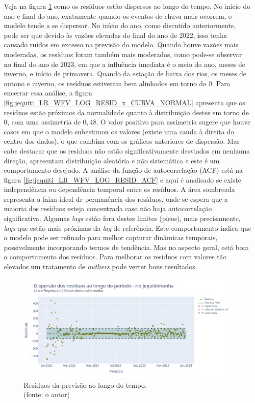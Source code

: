 Veja na figura \ref{fig:jequiti_LR_WFV_LOG_RESID_x_TEMPO} como os resíduos estão dispersos ao longo do tempo. No início do ano e final do ano, exatamente quando os eventos de chuva mais ocorrem, o modelo tende a se dispersar. No início do ano, como discutido anteriormente, pode ser que devido às vazões elevadas do final do ano de 2022, isso tenha causado ruídos em excesso na previsão do modelo. Quando houve vazões mais moderadas, os resíduos foram também mais moderados, como pode-se observar no final do ano de 2023, em que a influência imediata é o meio do ano, meses de inverno, e início de primavera. Quando da estação de baixa dos rios, os meses de outono e inverno, os resíduos estiveram bem alinhados em torno do $0$. Para encerrar essa análise, a figura \ref{fig:jequiti_LR_WFV_LOG_RESID_x_CURVA_NORMAL} apresenta que os resíduos estão próximos da normalidade quanto à distribuição destes em torno de $0$, com uma assimetria de $0,48$. O valor positivo para assimetria sugere que houve casos em que o modelo subestimou os valores (existe uma cauda à direita do centro dos dados), o que combina com os gráficos anteriores de dispersão. Mas cabe destacar que os resíduos não estão significativamente desviados em nenhuma direção, apresentam distribuição aleatória e não sistemática e este é um comportamento desejado. A análise da função de autocorrelação (ACF) está na figura \ref{fig:jequiti_LR_WFV_LOG_RESID_ACF} e aqui é analisado se existe independência ou dependência temporal entre os resíduos. A área sombreada representa a faixa ideal de permanência dos resíduos, onde se espera que a maioria dos resíduos esteja concentrada caso não haja autocorrelação significativa. Algumas \textit{lags} estão fora destes limites (picos), mais precisamente, \textit{lags} que estão mais próximas da \textit{lag} de referência. Este comportamento indica que o modelo pode ser refinado para melhor capturar dinâmicas temporais, possivelmente incorporando termos de tendência. Mas no aspecto geral, está bom o comportamento dos resíduos. Para melhorar os resíduos com valores tão elevados um tratamento de \textit{outliers} pode verter bons resultados.

\begin{figure}[!h]
	\centering
	\includegraphics[scale=0.33]{Figuras/jequiti/wfv/LR/LR_WFV_LOG_RESID_x_TEMPO.png}
	\caption{Resíduos da previsão ao longo do tempo.\\(fonte: o autor)}
	\label{fig:jequiti_LR_WFV_LOG_RESID_x_TEMPO}
\end{figure}

